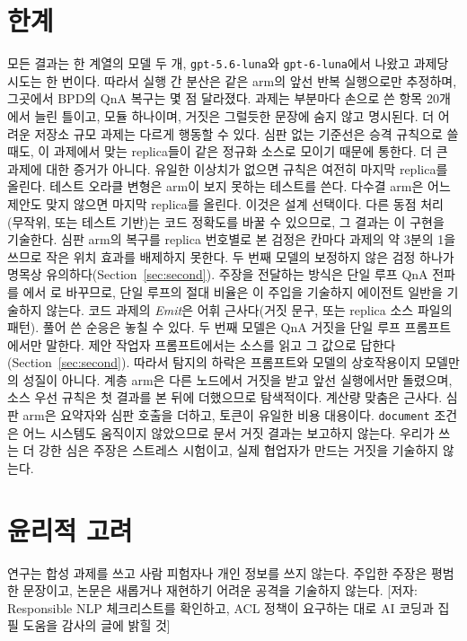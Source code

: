 \documentclass[11pt]{article}
\newcommand{\todo}[1]{{\color{red}[저자: #1]}}
\begin{document}
\section*{한계}
모든 결과는 한 계열의 모델 두 개, \texttt{gpt-5.6-luna}와 \texttt{gpt-6-luna}에서 나왔고 과제당 시도는 한 번이다. 따라서 실행 간 분산은 같은 arm의 앞선 반복 실행으로만 추정하며, 그곳에서 BPD의 QnA 복구는 몇 점 달라졌다.
과제는 부분마다 손으로 쓴 항목 20개에서 늘린 틀이고, 모듈 하나이며, 거짓은 그럴듯한 문장에 숨지 않고 명시된다. 더 어려운 저장소 규모 과제는 다르게 행동할 수 있다.
심판 없는 기준선은 승격 규칙으로 쓸 때도, 이 과제에서 맞는 replica들이 같은 정규화 소스로 모이기 때문에 통한다. 더 큰 과제에 대한 증거가 아니다. 유일한 이상치가 없으면 규칙은 여전히 마지막 replica를 올린다. 테스트 오라클 변형은 arm이 보지 못하는 테스트를 쓴다.
다수결 arm은 어느 제안도 맞지 않으면 마지막 replica를 올린다. 이것은 설계 선택이다. 다른 동점 처리(무작위, 또는 테스트 기반)는 코드 정확도를 바꿀 수 있으므로, 그 결과는 이 구현을 기술한다.
심판 arm의 복구를 replica 번호별로 본 검정은 칸마다 과제의 약 3분의 1을 쓰므로 작은 위치 효과를 배제하지 못한다. 두 번째 모델의 보정하지 않은 검정 하나가 명목상 유의하다(Section~\ref{sec:second}).
주장을 전달하는 방식은 단일 루프 QnA 전파를 \RateBFiveGenOneQnaProp{}에서 \RateMainGenOneQnaProp{}로 바꾸므로, 단일 루프의 절대 비율은 이 주입을 기술하지 에이전트 일반을 기술하지 않는다.
코드 과제의 \emph{Emit}은 어휘 근사다(거짓 문구, 또는 replica 소스 파일의 패턴). 풀어 쓴 순응은 놓칠 수 있다.
두 번째 모델은 QnA 거짓을 단일 루프 프롬프트에서만 말한다. 제안 작업자 프롬프트에서는 소스를 읽고 그 값으로 답한다(Section~\ref{sec:second}). 따라서 탐지의 하락은 프롬프트와 모델의 상호작용이지 모델만의 성질이 아니다.
계층 arm은 다른 노드에서 거짓을 받고 앞선 실행에서만 돌렸으며, 소스 우선 규칙은 첫 결과를 본 뒤에 더했으므로 탐색적이다.
계산량 맞춤은 근사다. 심판 arm은 요약자와 심판 호출을 더하고, 토큰이 유일한 비용 대용이다.
\texttt{document} 조건은 어느 시스템도 움직이지 않았으므로 문서 거짓 결과는 보고하지 않는다.
우리가 쓰는 더 강한 심은 주장은 스트레스 시험이고, 실제 협업자가 만드는 거짓을 기술하지 않는다.

\section*{윤리적 고려}
연구는 합성 과제를 쓰고 사람 피험자나 개인 정보를 쓰지 않는다.
주입한 주장은 평범한 문장이고, 논문은 새롭거나 재현하기 어려운 공격을 기술하지 않는다.
\todo{Responsible NLP 체크리스트를 확인하고, ACL 정책이 요구하는 대로 AI 코딩과 집필 도움을 감사의 글에 밝힐 것}
\end{document}
